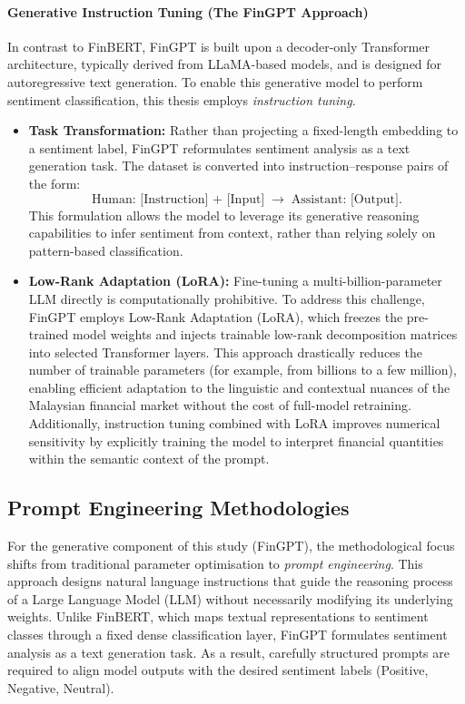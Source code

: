 \documentclass[singlespace]{ucetd}
\begin{document}
\paragraph{Generative Instruction Tuning (The FinGPT Approach)}

In contrast to FinBERT, FinGPT is built upon a decoder-only Transformer architecture, typically derived from LLaMA-based models, and is designed for autoregressive text generation. To enable this generative model to perform sentiment classification, this thesis employs \emph{instruction tuning}.

\begin{itemize}
    \item \textbf{Task Transformation:}  
    Rather than projecting a fixed-length embedding to a sentiment label, FinGPT reformulates sentiment analysis as a text generation task. The dataset is converted into instruction--response pairs of the form:
    \[
        \text{Human: [Instruction] + [Input]} \;\rightarrow\;
        \text{Assistant: [Output]}.
    \]
    This formulation allows the model to leverage its generative reasoning capabilities to infer sentiment from context, rather than relying solely on pattern-based classification.

    \item \textbf{Low-Rank Adaptation (LoRA):}  
    Fine-tuning a multi-billion-parameter LLM directly is computationally prohibitive. To address this challenge, FinGPT employs Low-Rank Adaptation (LoRA), which freezes the pre-trained model weights and injects trainable low-rank decomposition matrices into selected Transformer layers. This approach drastically reduces the number of trainable parameters (for example, from billions to a few million), enabling efficient adaptation to the linguistic and contextual nuances of the Malaysian financial market without the cost of full-model retraining. Additionally, instruction tuning combined with LoRA improves numerical sensitivity by explicitly training the model to interpret financial quantities within the semantic context of the prompt.
\end{itemize}


\subsection{Prompt Engineering Methodologies}

For the generative component of this study (FinGPT), the methodological focus shifts from traditional parameter optimisation to \emph{prompt engineering}. This approach designs natural language instructions that guide the reasoning process of a Large Language Model (LLM) without necessarily modifying its underlying weights. Unlike FinBERT, which maps textual representations to sentiment classes through a fixed dense classification layer, FinGPT formulates sentiment analysis as a text generation task. As a result, carefully structured prompts are required to align model outputs with the desired sentiment labels (Positive, Negative, Neutral).
\end{document}
